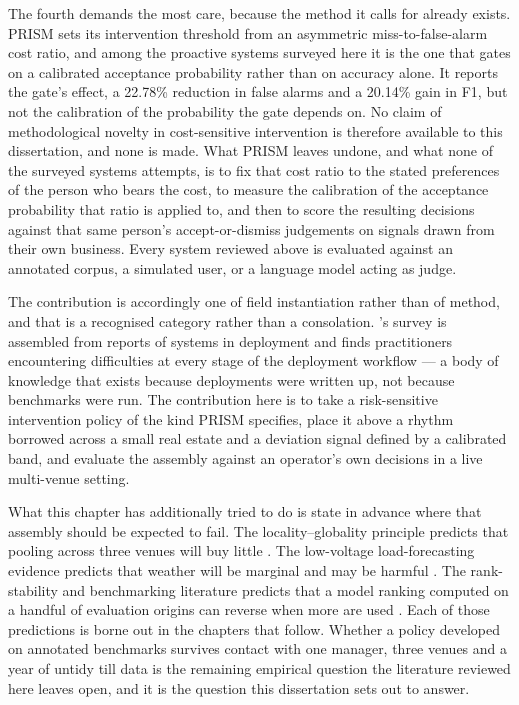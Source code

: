 The fourth demands the most care, because the method it calls for already
exists. PRISM \citep{fu_prism_2026} sets its intervention threshold from an
asymmetric miss-to-false-alarm cost ratio, and among the proactive systems
surveyed here it is the one that gates on a calibrated acceptance probability
rather than on accuracy alone. It reports the gate's effect, a 22.78\%
reduction in false alarms and a 20.14\% gain in F1, but not the calibration of
the probability the gate depends on. No claim of methodological novelty in
cost-sensitive intervention is therefore available to this dissertation, and
none is made. What PRISM leaves undone, and what none of the surveyed systems
attempts, is to fix that cost ratio to the stated preferences of the person who
bears the cost, to measure the calibration of the acceptance probability that
ratio is applied to, and then to score the resulting decisions against that
same person's accept-or-dismiss judgements on signals drawn from their own
business. Every system reviewed above is evaluated against an annotated corpus,
a simulated user, or a language model acting as judge.

The contribution is accordingly one of field instantiation rather than of
method, and that is a recognised category rather than a consolation.
\citet{paleyes_challenges_2022}'s survey is assembled from reports of systems
in deployment and finds practitioners encountering difficulties at every stage
of the deployment workflow --- a body of knowledge that exists because
deployments were written up, not because benchmarks were run. The contribution
here is to take a risk-sensitive intervention policy of the kind PRISM
specifies, place it above a rhythm borrowed across a small real estate and a
deviation signal defined by a calibrated band, and evaluate the assembly
against an operator's own decisions in a live multi-venue setting.

What this chapter has additionally tried to do is state in advance where that
assembly should be expected to fail. The locality--globality principle predicts
that pooling across three venues will buy little
\citep{montero-manso_principles_2021}. The low-voltage load-forecasting
evidence predicts that weather will be marginal and may be harmful
\citep{haben_short_2019,hertel_explainable_2026}. The rank-stability and
benchmarking literature predicts that a model ranking computed on a handful of
evaluation origins can reverse when more are used
\citep{hewamalage_look_2021,brigato_there_2025}. Each of those predictions is
borne out in the chapters that follow. Whether a policy developed on annotated
benchmarks survives contact with one manager, three venues and a year of untidy
till data is the remaining empirical question the literature reviewed here
leaves open, and it is the question this dissertation sets out to answer.
